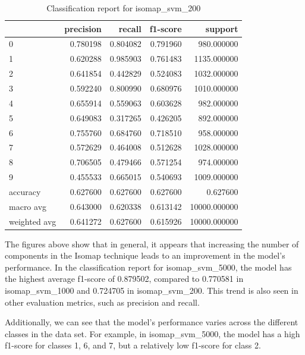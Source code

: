         \begin{table}[htb!]
            \centering
            \begin{tabular}{lrrrr}
                \toprule
                & precision & recall & f1-score & support \\
                \midrule
                0 & 0.780198 & 0.804082 & 0.791960 & 980.000000 \\
                1 & 0.620288 & 0.985903 & 0.761483 & 1135.000000 \\
                2 & 0.641854 & 0.442829 & 0.524083 & 1032.000000 \\
                3 & 0.592240 & 0.800990 & 0.680976 & 1010.000000 \\
                4 & 0.655914 & 0.559063 & 0.603628 & 982.000000 \\
                5 & 0.649083 & 0.317265 & 0.426205 & 892.000000 \\
                6 & 0.755760 & 0.684760 & 0.718510 & 958.000000 \\
            7 & 0.572629 & 0.464008 & 0.512628 & 1028.000000 \\
            8 & 0.706505 & 0.479466 & 0.571254 & 974.000000 \\
            9 & 0.455533 & 0.665015 & 0.540693 & 1009.000000 \\
            accuracy & 0.627600 & 0.627600 & 0.627600 & 0.627600 \\
            macro avg & 0.643000 & 0.620338 & 0.613142 & 10000.000000 \\
            weighted avg & 0.641272 & 0.627600 & 0.615926 & 10000.000000 \\
            \bottomrule
        \end{tabular}
        \caption{Classification report for isomap\_svm\_200}
        \label{tab:classification-report-isomap_svm_200}
    \end{table}
    
    The figures above show that in general, it appears that increasing the number of components in the Isomap technique leads to an improvement in the model's performance. In the classification report for isomap\_svm\_5000, the model has the highest average f1-score of 0.879502, compared to 0.770581 in isomap\_svm\_1000 and 0.724705 in isomap\_svm\_200. This trend is also seen in other evaluation metrics, such as precision and recall.
    
Additionally, we can see that the model's performance varies across the different classes in the data set. For example, in isomap\_svm\_5000, the model has a high f1-score for classes 1, 6, and 7, but a relatively low f1-score for class 2.


